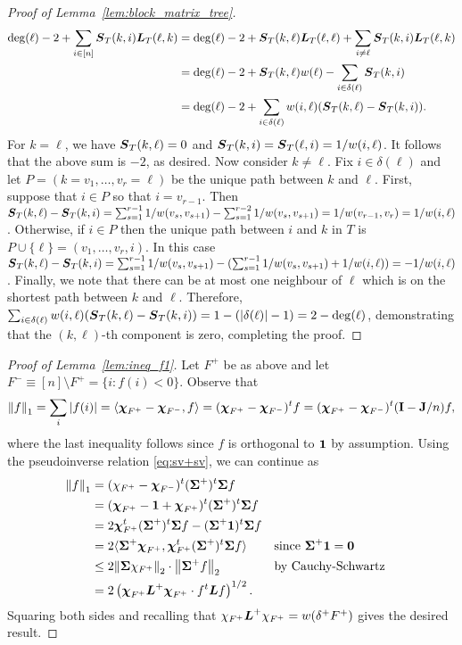 \begin{proof}[Proof of Lemma~\ref{lem:block_matrix_tree}]
	\begin{align*}
	\deg(\ell) - 2 + \sum_{i\in [n]} \vb*{S}_T(k,i)\vb*{L}_T(\ell,k) &= \deg(\ell) - 2 + \vb*{S}_T(k,\ell)\vb*{L}_T(\ell,\ell) + \sum_{i\neq \ell} \vb*{S}_T(k,i)\vb*{L}_T(\ell,k)\\
	&= \deg(\ell) -2 + \vb*{S}_T(k,\ell)w(\ell) - \sum_{i\in\delta(\ell)} \vb*{S}_T(k,i) \\
	&= \deg(\ell) -2 + \sum_{i\in\delta(\ell)}w(i,\ell)(\vb*{S}_T(k,\ell) - \vb*{S}_T(k,i)).
	\end{align*}
	For $k=\ell$, we have $\vb*{S}_T(k,\ell)=0$ and $\vb*{S}_T(k,i)=\vb*{S}_T(\ell,i) = 1/w(i,\ell)$. It  follows that the above sum is $-2$, as desired. 
	Now consider $k\neq \ell$. 
	Fix $i\in \delta(\ell)$ and let $P=(k=v_1,\dots,v_r=\ell)$ be the unique path between $k$  and $\ell$. First, suppose that $i\in P$ so that $i=v_{r-1}$. Then $\vb*{S}_T(k,\ell) - \vb*{S}_T(k,i) = \sum_{s=1}^{r-1}1/w(v_s,v_{s+1}) - \sum_{s=1}^{r-2} 1/w(v_s,v_{s+1}) = 1/w(v_{r-1},v_r) = 1/w(i,\ell)$. Otherwise,  if $i\in P$ then the unique path  between $i$ and $k$ in $T$ is $P\cup\{\ell\} = (v_1,\dots,v_r,i)$. In  this case  $\vb*{S}_T(k,\ell) - \vb*{S}_T(k,i) = \sum_{s=1}^{r-1}1/w(v_s,v_{s+1}) - (\sum_{s=1}^{r-1} 1/w(v_s,v_{s+1}) + 1/w(i,\ell)) = - 1/w(i,\ell)$. Finally, we note that there can be at most one neighbour of $\ell$ which is on the shortest path between $k$ and $\ell$. Therefore, 
	$\sum_{i\in\delta(\ell)}w(i,\ell)(\vb*{S}_T(k,\ell)-\vb*{S}_T(k,i)) = 1-(|\delta(\ell)|-1) = 2 - \deg(\ell)$, demonstrating that the $(k,\ell)$-th component is zero, completing the proof. 
\end{proof}

\begin{proof}[Proof of Lemma~\ref{lem:ineq_f1}]
	Let $F^+$ be as above and let $F^-\equiv [n]\setminus F^+=\{i:f(i)<0\}$. Observe that 
	\begin{equation*}
	\norm{f}_1=\sum_i |f(i)| = \langle \boldsymbol{\chi}_{F^+}-\boldsymbol{\chi}_{F^-},f\rangle = (\boldsymbol{\chi}_{F^+}-\boldsymbol{\chi}_{F^-})^t f = (\boldsymbol{\chi}_{F^+}-\boldsymbol{\chi}_{F^-})^t(\vb{I}-\vb{J}/n) f,
	\end{equation*}
	where the last inequality follows since $f$ is orthogonal to $\vb{1}$ by assumption. Using the pseudoinverse relation \eqref{eq:sv+sv}, we can continue as 
	\begin{align*}
	\norm{f}_1 &= (\chi_{F^+}-\boldsymbol{\chi}_{F^-})^t(\boldsymbol{\Sigma}^+)^t \boldsymbol{\Sigma} f \\
	&= (\boldsymbol{\chi}_{F^+}-\vb{1} + \boldsymbol{\chi}_{F^+})^t(\boldsymbol{\Sigma}^+)^t \boldsymbol{\Sigma} f \\
	&=2\boldsymbol{\chi}_{F^+}^t (\boldsymbol{\Sigma}^+)^t \boldsymbol{\Sigma} f - (\boldsymbol{\Sigma}^+\vb{1})^t \boldsymbol{\Sigma} f \\
	&= 2\langle \boldsymbol{\Sigma}^+\boldsymbol{\chi}_{F^+}, \boldsymbol{\chi}_{F^+}^t (\boldsymbol{\Sigma}^+)^t \boldsymbol{\Sigma} f \rangle &&\text{since }\boldsymbol{\Sigma}^+\vb{1} =\vb{0}\\
	&\leq 2\norm{\boldsymbol{\Sigma}\chi_{F^+}}_2 \cdot \norm{\boldsymbol{\Sigma}^+ f}_2 &&\text{by Cauchy-Schwartz}\\
	&= 2\left(\boldsymbol{\chi}_{F^+}\vb*{L}^+\boldsymbol{\chi}_{F^+}\cdot f^t \vb*{L} f\right)^{1/2}.
	\end{align*}
	Squaring both sides and recalling that $\chi_{F^+}\vb*{L}^+\chi_{F^+} = w(\delta^+F^+)$ gives the desired result. 
\end{proof}

